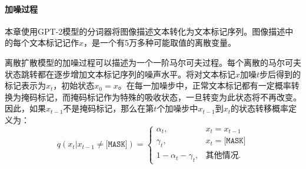 
\paragraph{加噪过程} 本章使用GPT-2模型的分词器\cite{gpt2}将图像描述文本转化为文本标记序列。图像描述中的每个文本标记记作$x$，是一个有5万多种可能取值的离散变量。

离散扩散模型的加噪过程可以描述为一个一阶马尔可夫过程。每个离散的马尔可夫状态跳转都在逐步增加文本标记序列的噪声水平。将对文本标记$x$加噪$t$步后得到的标记表示为$x_{t}$，初始状态$x_0=x$。在每一加噪步中，正常文本标记都有一定概率转换为掩码标记，而掩码标记作为特殊的吸收状态，一旦转变为此状态将不再改变。因此，如果$x_{t-1}$不是掩码标记，那么在第$t$个加噪步中$x_{t-1}$到$x_t$的状态转移概率定义为：
\begin{equation}
    q(x_t | x_{t - 1}\neq\texttt{[MASK]}) = 
    \begin{cases}
    \alpha_t, & x_t = x_{t - 1} \\
    \gamma_t, & x_t = \texttt{[MASK]} \\
    1 - \alpha_t - \gamma_t, & \text{其他情况}.
    \end{cases}
    \label{eq:iclip-q-nonmask}
\end{equation}

